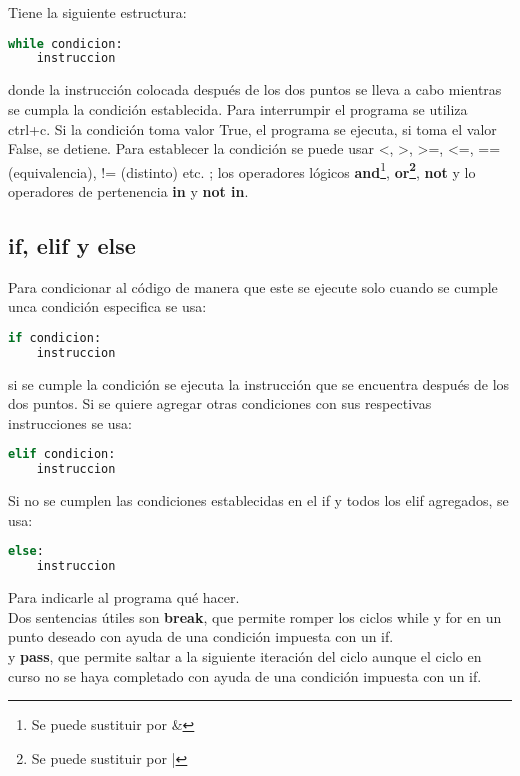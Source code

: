 \documentclass[10pt,oneside]{article}
\begin{document}
\begin{multicols}{2}
                Tiene la siguiente estructura:
    
                \begin{lstlisting}[language=Python]
while condicion:
    instruccion
                \end{lstlisting}

                donde la instrucción colocada después de los dos puntos se lleva a cabo mientras se cumpla la condición establecida. Para interrumpir el programa se utiliza ctrl+c. Si la condición toma valor True, el programa se ejecuta, si toma el valor False, se detiene. Para establecer la condición se puede usar <, >, >=, <=, == (equivalencia), != (distinto) etc. ; los operadores lógicos \textbf{and}\footnote{Se puede sustituir por \&}, \textbf{or\footnote{Se puede sustituir por |}}, \textbf{not} y lo operadores de pertenencia \textbf{in} y \textbf{not in}.                
            \subsection{if, elif y else}

                Para condicionar al código de manera que este se ejecute solo cuando se cumple unca condición especifica se usa:
    
                \begin{lstlisting}[language=Python]
if condicion:
    instruccion
                \end{lstlisting}

                si se cumple la condición se ejecuta la instrucción que se encuentra después de los dos puntos. Si se quiere agregar otras condiciones con sus respectivas instrucciones se usa: 

                \begin{lstlisting}[language=Python]
elif condicion:
    instruccion
                \end{lstlisting}

                Si no se cumplen las condiciones establecidas en el if y todos los elif agregados, se usa:

                \begin{lstlisting}[language=Python]
else:
    instruccion
                \end{lstlisting}

                Para indicarle al programa qué hacer. \\\newline Dos sentencias útiles son \textbf{break}, que permite romper los ciclos while y for en un punto deseado con ayuda de una condición impuesta con un if. \\ \newline y \textbf{pass}, que permite saltar a la siguiente iteración del ciclo aunque el ciclo en curso no se haya completado con ayuda de una condición impuesta con un if.


\end{multicols}
\end{document}
